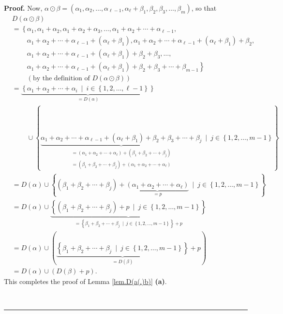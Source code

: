 \documentclass
[numbers=enddot,12pt,final,onecolumn,notitlepage,abstracton]{scrartcl}%
\theoremstyle{definition}
\newenvironment{proof}[1][Proof]{\noindent\textbf{#1.} }{\ \rule{0.5em}{0.5em}}
\newenvironment{verlong}{}{}
\begin{document}
\begin{verlong}
\begin{proof}
Now, $\alpha\odot\beta=\left(  \alpha_{1},\alpha_{2},\ldots,\alpha_{\ell
-1},\alpha_{\ell}+\beta_{1},\beta_{2},\beta_{3},\ldots,\beta_{m}\right)  $, so
that%
\begin{align*}
&  D\left(  \alpha\odot\beta\right) \\
&  =\left\{  \alpha_{1},\alpha_{1}+\alpha_{2},\alpha_{1}+\alpha_{2}+\alpha
_{3},\ldots,\alpha_{1}+\alpha_{2}+\cdots+\alpha_{\ell-1},\right. \\
&  \ \ \ \ \ \ \ \ \ \ \left.  \alpha_{1}+\alpha_{2}+\cdots+\alpha_{\ell
-1}+\left(  \alpha_{\ell}+\beta_{1}\right)  ,\alpha_{1}+\alpha_{2}%
+\cdots+\alpha_{\ell-1}+\left(  \alpha_{\ell}+\beta_{1}\right)  +\beta
_{2},\right. \\
&  \ \ \ \ \ \ \ \ \ \ \left.  \alpha_{1}+\alpha_{2}+\cdots+\alpha_{\ell
-1}+\left(  \alpha_{\ell}+\beta_{1}\right)  +\beta_{2}+\beta_{3}%
,\ldots,\right. \\
&  \ \ \ \ \ \ \ \ \ \ \left.  \alpha_{1}+\alpha_{2}+\cdots+\alpha_{\ell
-1}+\left(  \alpha_{\ell}+\beta_{1}\right)  +\beta_{2}+\beta_{3}+\cdots
+\beta_{m-1}\right\} \\
&  \ \ \ \ \ \ \ \ \ \ \left(  \text{by the definition of }D\left(
\alpha\odot\beta\right)  \right) \\
&  =\underbrace{\left\{  \alpha_{1}+\alpha_{2}+\cdots+\alpha_{i}\ \mid
\ i\in\left\{  1,2,\ldots,\ell-1\right\}  \right\}  }_{=D\left(
\alpha\right)  }\\
&  \ \ \ \ \ \ \ \ \ \ \cup\left\{  \underbrace{\alpha_{1}+\alpha_{2}%
+\cdots+\alpha_{\ell-1}+\left(  \alpha_{\ell}+\beta_{1}\right)  +\beta
_{2}+\beta_{3}+\cdots+\beta_{j}}_{\substack{=\left(  \alpha_{1}+\alpha
_{2}+\cdots+\alpha_{\ell}\right)  +\left(  \beta_{1}+\beta_{2}+\cdots
+\beta_{j}\right)  \\=\left(  \beta_{1}+\beta_{2}+\cdots+\beta_{j}\right)
+\left(  \alpha_{1}+\alpha_{2}+\cdots+\alpha_{\ell}\right)  }}\ \mid
\ j\in\left\{  1,2,\ldots,m-1\right\}  \right\} \\
&  =D\left(  \alpha\right)  \cup\left\{  \left(  \beta_{1}+\beta_{2}%
+\cdots+\beta_{j}\right)  +\underbrace{\left(  \alpha_{1}+\alpha_{2}%
+\cdots+\alpha_{\ell}\right)  }_{=p}\ \mid\ j\in\left\{  1,2,\ldots
,m-1\right\}  \right\} \\
&  =D\left(  \alpha\right)  \cup\underbrace{\left\{  \left(  \beta_{1}%
+\beta_{2}+\cdots+\beta_{j}\right)  +p\ \mid\ j\in\left\{  1,2,\ldots
,m-1\right\}  \right\}  }_{=\left\{  \beta_{1}+\beta_{2}+\cdots+\beta
_{j}\ \mid\ j\in\left\{  1,2,\ldots,m-1\right\}  \right\}  +p}\\
&  =D\left(  \alpha\right)  \cup\left(  \underbrace{\left\{  \beta_{1}%
+\beta_{2}+\cdots+\beta_{j}\ \mid\ j\in\left\{  1,2,\ldots,m-1\right\}
\right\}  }_{=D\left(  \beta\right)  }+p\right) \\
&  =D\left(  \alpha\right)  \cup\left(  D\left(  \beta\right)  +p\right)  .
\end{align*}
This completes the proof of Lemma \ref{lem.D(a(.)b)} \textbf{(a)}.


\end{proof}
\end{verlong}
\end{document}
